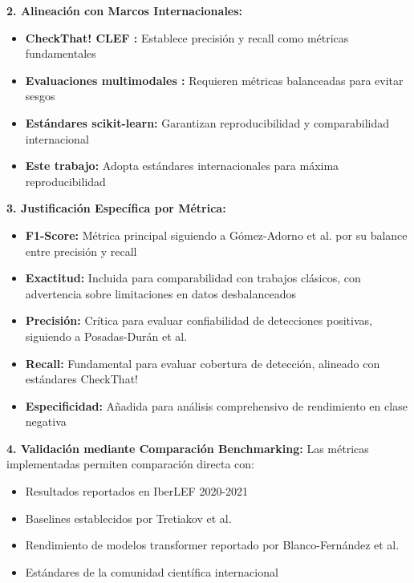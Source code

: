 \textbf{2. Alineación con Marcos Internacionales:}
\begin{itemize}
    \item \textbf{CheckThat! CLEF \cite{barron2023clef}:} Establece precisión y recall como métricas fundamentales
    \item \textbf{Evaluaciones multimodales \cite{alam2023overview}:} Requieren métricas balanceadas para evitar sesgos
    \item \textbf{Estándares scikit-learn:} Garantizan reproducibilidad y comparabilidad internacional
    \item \textbf{Este trabajo:} Adopta estándares internacionales para máxima reproducibilidad
\end{itemize}

\textbf{3. Justificación Específica por Métrica:}
\begin{itemize}
    \item \textbf{F1-Score:} Métrica principal siguiendo a Gómez-Adorno et al. \cite{gomez2021overview} por su balance entre precisión y recall
    \item \textbf{Exactitud:} Incluida para comparabilidad con trabajos clásicos, con advertencia sobre limitaciones en datos desbalanceados
    \item \textbf{Precisión:} Crítica para evaluar confiabilidad de detecciones positivas, siguiendo a Posadas-Durán et al. \cite{posadas2019detection}
    \item \textbf{Recall:} Fundamental para evaluar cobertura de detección, alineado con estándares CheckThat! \cite{barron2023clef}
    \item \textbf{Especificidad:} Añadida para análisis comprehensivo de rendimiento en clase negativa
\end{itemize}

\textbf{4. Validación mediante Comparación Benchmarking:}
Las métricas implementadas permiten comparación directa con:
\begin{itemize}
    \item Resultados reportados en IberLEF 2020-2021
    \item Baselines establecidos por Tretiakov et al. \cite{tretiakov2022detection}
    \item Rendimiento de modelos transformer reportado por Blanco-Fernández et al. \cite{blanco2024enhancing}
    \item Estándares de la comunidad científica internacional
\end{itemize}

